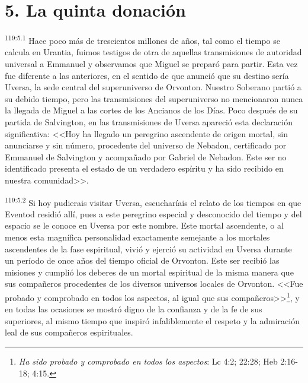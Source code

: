 \section*{5. La quinta donación}
\par
\textsuperscript{119:5.1} Hace poco más de trescientos millones de años, tal como el tiempo se calcula en Urantia, fuimos testigos de otra de aquellas transmisiones de autoridad universal a Emmanuel y observamos que Miguel se preparó para partir. Esta vez fue diferente a las anteriores, en el sentido de que anunció que su destino sería Uversa, la sede central del superuniverso de Orvonton. Nuestro Soberano partió a su debido tiempo, pero las transmisiones del superuniverso no mencionaron nunca la llegada de Miguel a las cortes de los Ancianos de los Días. Poco después de su partida de Salvington, en las transmisiones de Uversa apareció esta declaración significativa: <<Hoy ha llegado un peregrino ascendente de origen mortal, sin anunciarse y sin número, procedente del universo de Nebadon, certificado por Emmanuel de Salvington y acompañado por Gabriel de Nebadon. Este ser no identificado presenta el estado de un verdadero espíritu y ha sido recibido en nuestra comunidad>>.

\par
\textsuperscript{119:5.2} Si hoy pudierais visitar Uversa, escucharíais el relato de los tiempos en que Eventod residió allí, pues a este peregrino especial y desconocido del tiempo y del espacio se le conoce en Uversa por este nombre. Este mortal ascendente, o al menos esta magnífica personalidad exactamente semejante a los mortales ascendentes de la fase espiritual, vivió y ejerció su actividad en Uversa durante un período de once años del tiempo oficial de Orvonton. Este ser recibió las misiones y cumplió los deberes de un mortal espiritual de la misma manera que sus compañeros procedentes de los diversos universos locales de Orvonton. <<Fue probado y comprobado en todos los aspectos, al igual que sus compañeros>>\footnote{\textit{Ha sido probado y comprobado en todos los aspectos}: Lc 4:2; 22:28; Heb 2:16-18; 4:15.}, y en todas las ocasiones se mostró digno de la confianza y de la fe de sus superiores, al mismo tiempo que inspiró infaliblemente el respeto y la admiración leal de sus compañeros espirituales.


